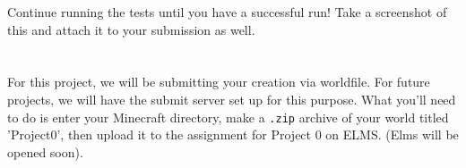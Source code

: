 \documentclass{article}
\begin{document}
Continue running the tests until you have a successful run! Take a screenshot of this and attach it to your submission as well.

    \section{\selectfont{Submission}}
    
        \par For this project, we will be submitting your creation via worldfile. For future projects, we will have the submit server set up for this purpose. What you'll need to do is enter your Minecraft directory, make a \texttt{.zip} archive of your world titled 'Project0', then upload it to the assignment for Project 0 on ELMS. (Elms will be opened soon).
        
\end{document}
